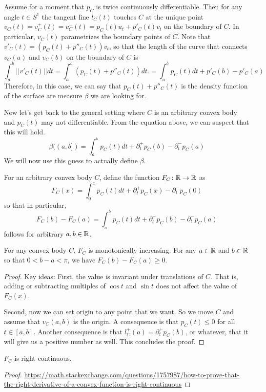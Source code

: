 Assume for a moment that $p_C$ is twice continuously differentiable.
Then for any angle $t \in S^1$ the tangent line $l_C(t)$ touches $C$ at the unique point $v_C(t) = v_C^+(t) = v_C^-(t) = p_C(t)u_t + p'_C(t)v_t$ on the boundary of $C$.
In particular, $v_C(t)$ parametrizes the boundary points of $C$.
Note that $v'_C(t) = (p_C(t) + p''_C(t))v_t$,
so that the length of the curve that connects $v_C(a)$ and $v_C(b)$ on the boundary of $C$ is 
$$\int_a^b ||v'_C(t)||dt 
= \int_a^b (p_C(t) + p''_C(t)) dt.
= \int_a^b p_C(t) dt + p'_C(b) - p'_C(a)$$
Therefore, in this case, we can say that $p_C(t) + p''_C(t)$ is the density function of the surface are measure $\beta$ we are looking for.

Now let's get back to the general setting where $C$ is an arbitrary convex body and $p_C(t)$ may not differentiable.
From the equation above, we can suspect that this will hold.
$$
\beta((a, b]) = \int_a^b p_C(t) dt + \partial^+_t p_C(b) - \partial^-_t p_C(a)
$$
We will now use this guess to actually define $\beta$.

\begin{definition}
For an arbitrary convex body $C$,
define the function $F_C \colon \mathbb{R} \rightarrow \mathbb{R}$ as 
$$
F_C(x) = \int_0^x p_C(t)dt + \partial^+_t p_C(x) - \partial^-_t p_C(0)
$$
so that in particular, 
$$
F_C(b) - F_C(a) = \int_a^b p_C(t)dt + \partial^+_t p_C(b) - \partial^-_t p_C(a)
$$
follows for arbitrary $a, b \in \mathbb{R}$.
\end{definition}

\begin{theorem}
For any convex body $C$, $F_C$ is monotonically increasing.
For any $a \in \mathbb{R}$ and $b \in \mathbb{R}$ so that $0 < b - a < \pi$,
we have $F_C(b) - F_C(a) \geq 0$.
\end{theorem}
\begin{proof}
Key ideas: 
First, the value is invariant under
translations of $C$.
That is, adding or subtracting multiples of $\cos t$ and $\sin t$ does not affect the value of $F_C(x)$.

Second, now we can set origin to any point that we want.
So we move $C$ and assume that $v_C(a, b)$ is the origin.
A consequence is that $p_C(t) \leq 0$ for all $t \in [a, b]$.
Another consequence is that $l_C^+(a) = \partial^+_tp_C(b)$, or whatever, that it will give us a positive number as well. This concludes the proof.  
\end{proof}

\begin{theorem}
$F_C$ is right-continuous.	
\end{theorem}
\begin{proof}
\url{https://math.stackexchange.com/questions/1757987/how-to-prove-that-the-right-derivative-of-a-convex-function-is-right-continuous}	
\end{proof}

